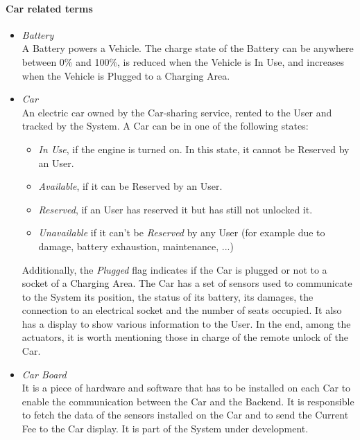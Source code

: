 \paragraph{Car related terms}
	\begin{itemize}
		\item \emph{Battery} \\
		A Battery powers a Vehicle. The charge state of the Battery can be anywhere between 0\% and 100\%, is reduced when the Vehicle is In Use, and increases when the Vehicle is Plugged to a Charging Area.
		
		\item \emph{Car} \\
		An electric car owned by the Car-sharing service, rented to the User and tracked by the System. A Car can be in one of the following states:
		\begin{itemize}
			\item \textit{In Use}, if the engine is turned on. In this state, it cannot be Reserved by an User.
			\item \textit{Available}, if it can be Reserved by an User.
			\item \textit{Reserved}, if an User has reserved it but has still not unlocked it.
			\item \textit{Unavailable} if it can't be \textit{Reserved} by any User (for example due to damage, battery exhaustion, maintenance, ...)
		\end{itemize}
		Additionally, the \textit{Plugged} flag indicates if the {Car} is plugged or not to a socket of a Charging Area.
		The Car has a set of sensors used to communicate to the System its position, the status of its battery, its damages, the connection to an electrical socket and the number of seats occupied. It also has a display to show various information to the User. In the end, among the actuators, it is worth mentioning those in charge of the remote unlock of the Car.
	
		\item \emph{Car Board} \\
		It is a piece of hardware and software that has to be installed on each Car to enable the communication between the Car and the Backend. It is responsible to fetch the data of the sensors installed on the Car and to send the Current Fee to the Car display. It is part of the System under development.
				

\end{itemize}
